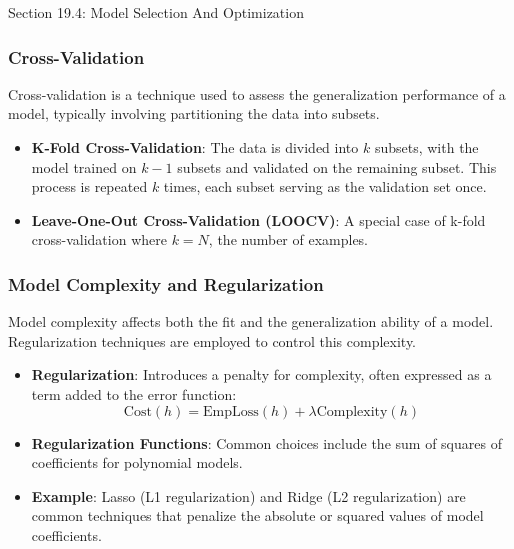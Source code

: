 \begin{notes}{Section 19.4: Model Selection And Optimization}
\begin{highlight}
    \end{highlight}
    
    \subsubsection*{Cross-Validation}
    
    Cross-validation is a technique used to assess the generalization performance of a model, typically involving partitioning the data into subsets.
    
    \begin{highlight}
    
        \begin{itemize}
            \item \textbf{K-Fold Cross-Validation}: The data is divided into $k$ subsets, with the model trained on $k-1$ subsets and validated on the remaining subset. This process is repeated $k$ 
            times, each subset serving as the validation set once.
            \item \textbf{Leave-One-Out Cross-Validation (LOOCV)}: A special case of k-fold cross-validation where $k = N$, the number of examples.
        \end{itemize}
    
    \end{highlight}
    
    \subsubsection*{Model Complexity and Regularization}
    
    Model complexity affects both the fit and the generalization ability of a model. Regularization techniques are employed to control this complexity.
    
    \begin{highlight}
    
        \begin{itemize}
            \item \textbf{Regularization}: Introduces a penalty for complexity, often expressed as a term added to the error function:
            \[
            \text{Cost}(h) = \text{EmpLoss}(h) + \lambda \text{Complexity}(h)
            \]
            \item \textbf{Regularization Functions}: Common choices include the sum of squares of coefficients for polynomial models.
            \item \textbf{Example}: Lasso (L1 regularization) and Ridge (L2 regularization) are common techniques that penalize the absolute or squared values of model coefficients.
        \end{itemize}
    

\end{highlight}
\end{notes}
